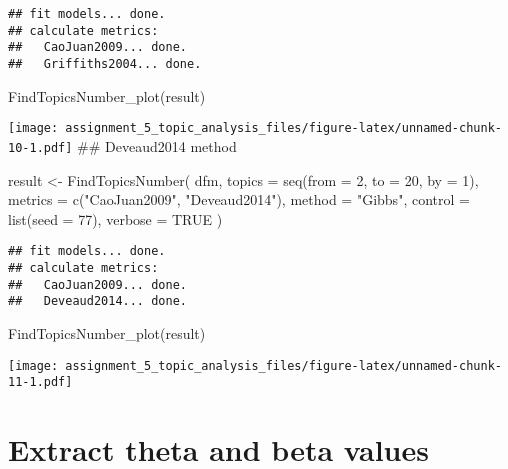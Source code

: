 \documentclass[
]{article}
\newenvironment{Shaded}{\begin{snugshade}}{\end{snugshade}}
\newcommand{\AttributeTok}[1]{\textcolor[rgb]{0.77,0.63,0.00}{#1}}
\newcommand{\ConstantTok}[1]{\textcolor[rgb]{0.00,0.00,0.00}{#1}}
\newcommand{\DecValTok}[1]{\textcolor[rgb]{0.00,0.00,0.81}{#1}}
\newcommand{\FunctionTok}[1]{\textcolor[rgb]{0.00,0.00,0.00}{#1}}
\newcommand{\NormalTok}[1]{#1}
\newcommand{\OtherTok}[1]{\textcolor[rgb]{0.56,0.35,0.01}{#1}}
\newcommand{\StringTok}[1]{\textcolor[rgb]{0.31,0.60,0.02}{#1}}
\begin{document}
\begin{verbatim}
## fit models... done.
## calculate metrics:
##   CaoJuan2009... done.
##   Griffiths2004... done.
\end{verbatim}

\begin{Shaded}
\begin{Highlighting}[]
\FunctionTok{FindTopicsNumber\_plot}\NormalTok{(result)}
\end{Highlighting}
\end{Shaded}

\texttt{[image: assignment\_5\_topic\_analysis\_files/figure-latex/unnamed-chunk-10-1.pdf]}
\#\# Deveaud2014 method

\begin{Shaded}
\begin{Highlighting}[]
\NormalTok{result }\OtherTok{\textless{}{-}} \FunctionTok{FindTopicsNumber}\NormalTok{(}
\NormalTok{  dfm,}
  \AttributeTok{topics =} \FunctionTok{seq}\NormalTok{(}\AttributeTok{from =} \DecValTok{2}\NormalTok{, }\AttributeTok{to =} \DecValTok{20}\NormalTok{, }\AttributeTok{by =} \DecValTok{1}\NormalTok{),}
  \AttributeTok{metrics =} \FunctionTok{c}\NormalTok{(}\StringTok{"CaoJuan2009"}\NormalTok{, }\StringTok{"Deveaud2014"}\NormalTok{),}
  \AttributeTok{method =} \StringTok{"Gibbs"}\NormalTok{,}
  \AttributeTok{control =} \FunctionTok{list}\NormalTok{(}\AttributeTok{seed =} \DecValTok{77}\NormalTok{),}
  \AttributeTok{verbose =} \ConstantTok{TRUE}
\NormalTok{)}
\end{Highlighting}
\end{Shaded}

\begin{verbatim}
## fit models... done.
## calculate metrics:
##   CaoJuan2009... done.
##   Deveaud2014... done.
\end{verbatim}

\begin{Shaded}
\begin{Highlighting}[]
\FunctionTok{FindTopicsNumber\_plot}\NormalTok{(result)}
\end{Highlighting}
\end{Shaded}

\texttt{[image: assignment\_5\_topic\_analysis\_files/figure-latex/unnamed-chunk-11-1.pdf]}

\hypertarget{extract-theta-and-beta-values}{%
\section{Extract theta and beta
values}\label{extract-theta-and-beta-values}}
\end{document}
